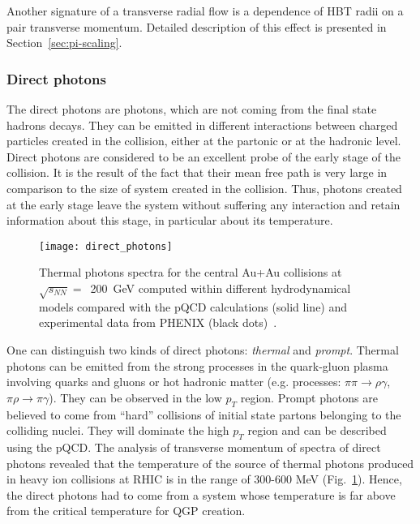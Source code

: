         Another signature of a transverse radial flow is a dependence of HBT radii on a pair transverse momentum.
        Detailed description of this effect is presented in Section~\ref{sec:pi-scaling}.
      \subsubsection{Direct photons}
        The direct photons are photons, which are not coming from the final state hadrons decays.
        They can be emitted in different interactions between charged particles created in the collision, either at the partonic or at the hadronic level.
        Direct photons are considered to be an excellent probe of the early stage of the collision.
        It is the result of the fact that their mean free path is very large in comparison to the size of system created in the collision.
        Thus, photons created at the early stage leave the system without suffering any interaction and retain information about this stage, in particular about its temperature.

        \begin{figure}[b]
          \centering
          \texttt{[image: direct\_photons]}
          \caption{Thermal photons spectra for the central Au+Au collisions at $\sqrt{s_{NN}}=$~200~GeV computed within different hydrodynamical models compared with the pQCD calculations (solid line) and experimental data from PHENIX (black dots)~\cite{rapp_xu}.}
          \label{fig:direct_photons}
        \end{figure}
        One can distinguish two kinds of direct photons: \textit{thermal} and \textit{prompt}.
        Thermal photons can be emitted from the strong processes in the quark-gluon plasma involving quarks and gluons or hot hadronic matter (e.g. processes: $\pi\pi \to \rho \gamma$, $\pi\rho \to \pi \gamma$).
        They can be observed in the low $p_T$ region.
        Prompt photons are believed to come from ``hard'' collisions of initial state partons belonging to the colliding nuclei.
        They will dominate the high $p_T$ region and can be described using the pQCD.
        The analysis of transverse momentum of spectra of direct photons revealed that the temperature of the source of thermal photons produced in heavy ion collisions at RHIC is in the range of 300-600 MeV (Fig.~\ref{fig:direct_photons}).
        Hence, the direct photons had to come from a system whose temperature is far above from the critical temperature for QGP creation.

